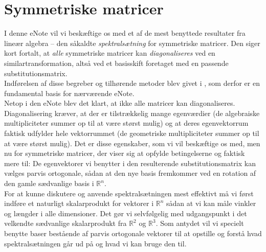 

\setcounter{chapter}{18} %


\chapter{Symmetriske matricer} \label{tn19}

\begin{basis}
I denne eNote vil vi beskæftige os med  et af de mest benyttede resultater fra lineær algebra -- den såkaldte {\emph{spektralsætning}} for symmetriske matricer. Den siger kort fortalt, at {\emph{alle}} symmetriske matricer kan {\emph{diagonaliseres}} ved en similartransformation, altså ved et basisskift foretaget med en passende substitutionsmatrix. \\

Indførelsen af disse begreber og tilhørende metoder blev givet i
, som derfor er en fundamental basis for nærværende eNote. \\

Netop i den eNote blev det klart, at ikke alle matricer kan diagonaliseres. Diagonalisering kræver, at der er tilstrækkelig mange egenværdier (de algebraiske multipliciteter summer op til at være størst mulig) og at deres egenvektorrum faktisk udfylder hele vektorrummet (de geometriske multipliciteter summer op til at være størst mulig). Det er disse egenskaber, som vi vil beskæftige os med, men nu for symmetriske matricer, der viser sig at opfylde  betingelserne og faktisk mere til: De egenvektorer vi benytter i den resulterende substitutionsmatrix kan vælges parvis ortogonale, sådan at den nye basis fremkommer ved en rotation af den gamle sædvanlige basis i $\mathbb{R}^{n}$.\\

For at kunne diskutere og anvende spektralsætningen mest effektivt må vi først indføre et naturligt skalarprodukt for vektorer i $\mathbb{R}^{n}$ sådan at vi kan måle vinkler og længder i alle dimensioner. Det gør vi selvfølgelig med udgangspunkt i det velkendte sædvanlige skalarprodukt fra $\mathbb{R}^{2}$  og $\mathbb{R}^{3}$. Som antydet vil vi specielt benytte baser bestående af parvis ortogonale vektorer til at opstille og forstå hvad spektralsætningen går ud på og hvad vi kan bruge den til.
\end{basis}


